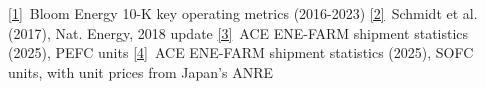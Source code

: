 \href{https://www.sec.gov/cgi-bin/browse-edgar?action=getcompany&CIK=1664703&type=10-K}{[1]}~Bloom Energy 10-K key operating metrics (2016-2023)\quad
\href{https://doi.org/10.1038/nenergy.2017.110}{[2]}~Schmidt et al. (2017), Nat. Energy, 2018 update\quad
\href{https://www.ace.or.jp/fc/m/DocFile/Org/20250117130901_29_DocFile1.pdf}{[3]}~ACE ENE-FARM shipment statistics (2025), PEFC units\quad
\href{https://www.ace.or.jp/fc/m/DocFile/Org/20250117130901_29_DocFile1.pdf}{[4]}~ACE ENE-FARM shipment statistics (2025), SOFC units, with unit prices from Japan's ANRE
